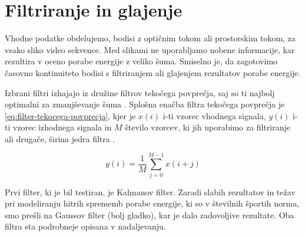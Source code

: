 \section{Filtriranje in glajenje}\label{sec:filtri}
Vhodne podatke obdelujemo, bodisi z optičnim tokom ali prostorskim tokom, za vsako sliko video sekvence. Med slikami ne uporabljamo nobene informacije, kar rezultira v oceno porabe energije z veliko šuma. Smiselno je, da zagotovimo časovno kontinuiteto bodisi s filtriranjem ali glajenjem rezultatov porabe energije.

Izbrani filtri izhajajo iz družine filtrov tekočega povprečja, saj so ti najbolj optimalni za zmanjševanje šuma \cite{smith1997scientist}. Splošna enačba filtra tekočega povprečja je \eqref{eq:filter-tekocega-povprecja}, kjer je $x(i)$ i-ti vzorec vhodnega signala, $y(i)$ i-ti vzorec izhodnega signala in $M$ število vzorcev, ki jih uporabimo za filtriranje ali drugače, širina jedra filtra \cite{smith1997scientist}.

\begin{equation}
y(i) = \frac{1}{M} \sum_{j=0}^{M-1} x(i + j)
\label{eq:filter-tekocega-povprecja}
\end{equation}

Prvi filter, ki je bil testiran, je Kalmanov filter. Zaradi slabih rezultatov in težav pri modeliranju hitrih sprememb porabe energije, ki so v številnih športih norma, smo prešli na Gaussov filter (bolj gladko), kar je dalo zadovoljive rezultate. Oba filtra sta podrobneje opisana v nadaljevanju.





